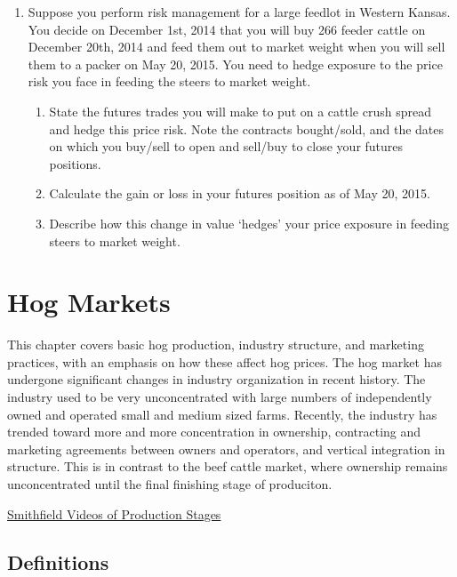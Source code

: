\documentclass[]{book}
\providecommand{\tightlist}{%
  \setlength{\itemsep}{0pt}\setlength{\parskip}{0pt}}
\theoremstyle{definition}
\theoremstyle{definition}
\theoremstyle{remark}
\begin{document}
\begin{enumerate}
\def\labelenumi{\arabic{enumi}.}
\item
  Suppose you perform risk management for a large feedlot in Western
  Kansas. You decide on December 1st, 2014 that you will buy 266 feeder
  cattle on December 20th, 2014 and feed them out to market weight when
  you will sell them to a packer on May 20, 2015. You need to hedge
  exposure to the price risk you face in feeding the steers to market
  weight.

  \begin{enumerate}
  \def\labelenumii{\alph{enumii}.}
  \tightlist
  \item
    State the futures trades you will make to put on a cattle crush
    spread and hedge this price risk. Note the contracts bought/sold,
    and the dates on which you buy/sell to open and sell/buy to close
    your futures positions.
  \item
    Calculate the gain or loss in your futures position as of May 20,
    2015.
  \item
    Describe how this change in value `hedges' your price exposure in
    feeding steers to market weight.
  \end{enumerate}
\end{enumerate}

\chapter{Hog Markets}\label{hog-markets}

This chapter covers basic hog production, industry structure, and
marketing practices, with an emphasis on how these affect hog prices.
The hog market has undergone significant changes in industry
organization in recent history. The industry used to be very
unconcentrated with large numbers of independently owned and operated
small and medium sized farms. Recently, the industry has trended toward
more and more concentration in ownership, contracting and marketing
agreements between owners and operators, and vertical integration in
structure. This is in contrast to the beef cattle market, where
ownership remains unconcentrated until the final finishing stage of
produciton.

\href{http://www.murphybrownllc.com/contract-growing/hog-production/}{Smithfield
Videos of Production Stages}

\section{Definitions}\label{definitions}
\end{document}
